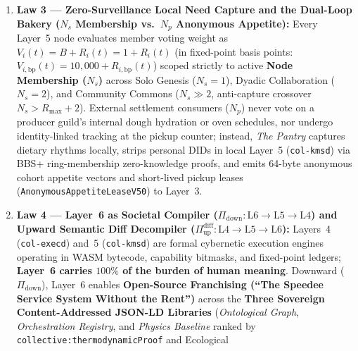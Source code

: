 \begin{enumerate}
\begin{itemize}
                    breaker power in \texttt{mW}, exergy in \texttt{uJ}, thermal delta in
                    \texttt{mK}, spatial polygon in \texttt{mm}, and mandatory finite
                    \texttt{lease\_ttl\_ms}) across fractal envelopes (\textit{Room/Building $\to$
                    Street/Microgrid $\to$ Bioregional Watershed}) via \textbf{Two-Speed
                    Jurisprudence} (\textit{Fast-Path Layer~2 Hazard Preemption} and
                    \textit{Slow-Path Semantic Diff Precedent Compilation}).
          \end{itemize}
    \item \textbf{Law 3 --- Zero-Surveillance Local Need Capture and the Dual-Loop Bakery ($N_s$ Membership vs.\ $N_p$ Anonymous Appetite):}
          Every Layer~5 node evaluates member voting weight as $V_i(t) = B + R_i(t) = 1 + R_i(t)$
          (in fixed-point basis points: $V_{i,\mathrm{bp}}(t) = 10{,}000 + R_{i,\mathrm{bp}}(t)$)
          scoped strictly to active \textbf{Node Membership ($N_s$)} across Solo Genesis ($N_s=1$),
          Dyadic Collaboration ($N_s=2$), and Community Commons ($N_s \gg 2$, anti-capture
          crossover $N_s > R_{\max} + 2$). External settlement consumers ($N_p$) never vote on a
          producer guild's internal dough hydration or oven schedules, nor undergo identity-linked
          tracking at the pickup counter; instead, \textit{The Pantry} captures dietary rhythms
          locally, strips personal DIDs in local Layer~5 (\texttt{col-kmsd}) via BBS+
          ring-membership zero-knowledge proofs, and emits 64-byte anonymous cohort appetite vectors
          and short-lived pickup leases (\texttt{AnonymousAppetiteLeaseV50}) to Layer~3.
    \item \textbf{Law 4 --- Layer~6 as Societal Compiler ($\Pi_{\mathrm{down}} : \mathrm{L6} \to \mathrm{L5} \to \mathrm{L4}$) and Upward Semantic Diff Decompiler ($\Pi_{\mathrm{up}}^{\mathrm{diff}} : \mathrm{L4} \to \mathrm{L5} \to \mathrm{L6}$):}
          Layers~4 (\texttt{col-execd}) and~5 (\texttt{col-kmsd}) are formal cybernetic execution
          engines operating in WASM bytecode, capability bitmasks, and fixed-point ledgers;
          \textbf{Layer~6 carries $100\%$ of the burden of human meaning}. Downward
          ($\Pi_{\mathrm{down}}$), Layer~6 enables \textbf{Open-Source Franchising (``The Speedee
          Service System Without the Rent'')} across the \textbf{Three Sovereign Content-Addressed
          JSON-LD Libraries} (\textit{Ontological Graph}, \textit{Orchestration Registry}, and
          \textit{Physics Baseline} ranked by \texttt{collective:thermodynamicProof} and Ecological

\end{enumerate}
